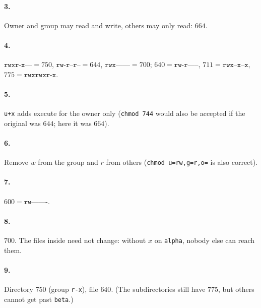 \documentclass[11pt,a4paper]{article}
\begin{document}
\paragraph{3.} Owner and group may read and write, others may only read: $664$.


\paragraph{4.} $\texttt{rwxr-x---} = 750$, $\texttt{rw-r--r--} = 644$, $\texttt{rwx------} = 700$; $640 = \texttt{rw-r-----}$, $711 = \texttt{rwx--x--x}$, $775 = \texttt{rwxrwxr-x}$.

\paragraph{5.} \texttt{u+x} adds execute for the owner only (\texttt{chmod 744} would also be accepted if the original was $644$; here it was $664$).


\paragraph{6.} Remove $w$ from the group and $r$ from others (\texttt{chmod u=rw,g=r,o=} is also correct).


\paragraph{7.} $600 = \texttt{rw-------}$.


\paragraph{8.} $700$. The files inside need not change: without $x$ on \texttt{alpha}, nobody else can reach them.


\paragraph{9.} Directory $750$ (group \texttt{r-x}), file $640$. (The subdirectories still have $775$, but others cannot get past \texttt{beta}.)

\end{document}
